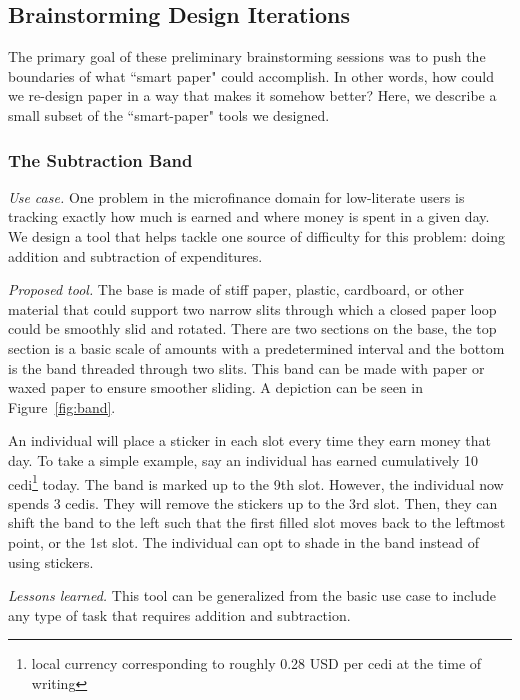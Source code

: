 \documentclass{sig-alternate}
\begin{document}
\subsection{Brainstorming Design Iterations}
\label{sec:brainstorming}

The primary goal of these preliminary brainstorming sessions was to push the boundaries of what ``smart paper" could accomplish. In other words, how could we re-design paper in a way that makes it somehow better? Here, we describe a small subset of the ``smart-paper" tools we designed.

\subsubsection{The Subtraction Band}
\label{sec:subtraction}

\emph{Use case.}
One problem in the microfinance domain for low-literate users is tracking exactly how much is earned and where money is spent in a given day. We design a tool that helps tackle one source of difficulty for this problem: doing addition and subtraction of expenditures.

\emph{Proposed tool.}
The base is made of stiff paper, plastic, cardboard, or other material that could support two narrow slits through which a closed paper loop could be smoothly slid and rotated. There are two sections on the base, the top section is a basic scale of amounts with a predetermined interval and the bottom is the band threaded through two slits. This band can be made with paper or waxed paper to ensure smoother sliding. A depiction can be seen in Figure~\ref{fig:band}.

An individual will place a sticker in each slot every time they earn money that day. To take a simple example, say an individual has earned cumulatively 10 cedi\footnote{local currency corresponding to roughly 0.28 USD per cedi at the time of writing} today. The band is marked up to the 9th slot. However, the individual now spends 3 cedis. They will remove the stickers up to the 3rd slot. Then, they can shift the band to the left such that the first filled slot moves back to the leftmost point, or the 1st slot.
The individual can opt to shade in the band instead of using stickers.

\emph{Lessons learned.}
This tool can be generalized from the basic use case to include any type of task that requires addition and subtraction. 
\end{document}
